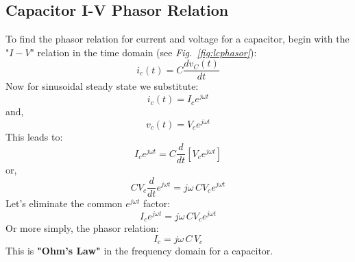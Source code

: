 \subsection{Capacitor I-V Phasor Relation}
To find the phasor relation for current and voltage for a capacitor, begin with the "$I-V$" relation in the time domain (see \emph{Fig.~\ref{fig:lcphasor}}):
    \begin{equation}
        {i_c}(t) = C\frac{{d{v_C}(t)}}{{dt}}
    \end{equation}
Now for sinusoidal steady state we substitute:
    \begin{equation}
        {i_c}(t) = {I_c}{e^{j\omega t}}
    \end{equation}
and,
    \begin{equation}
        {v_c}(t) = {V_c}{e^{j\omega t}}
    \end{equation}
This leads to:
    \begin{equation}
        {I_c}{e^{j\omega t}} = C\frac{d}{{dt}}[{V_c}{e^{j\omega t}}]
    \end{equation}
or,
    \begin{equation}
        C{V_c}\frac{d}{{dt}}{e^{j\omega t}} = j\omega \,C{V_c}{e^{j\omega t}}
    \end{equation}
Let's eliminate the common $e^{j\omega t}$ factor:
    \begin{equation}
        {I_c}{e^{j\omega t}} = j\omega \,C{V_c}{e^{j\omega t}}
    \end{equation}
Or more simply, the phasor relation:
    \begin{equation}
        {I_c} = j\omega \,C\,{V_c}
    \end{equation}
This is \textbf{"Ohm's Law"} in the frequency domain for a capacitor.
